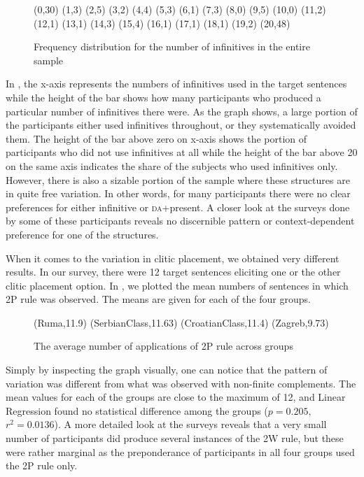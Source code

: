 \documentclass[output=paper,modfonts,newtxmath,hidelinks,]{langscibook}
\begin{document}
\begin{figure}[h]
\footnotesize
\textsf{
%
{
(0,30) (1,3) (2,5) (3,2) (4,4) (5,3) (6,1) (7,3) (8,0) (9,5) (10,0) (11,2) (12,1) (13,1) (14,3) (15,4) (16,1) (17,1) (18,1) (19,2) (20,48)
}}
\caption{Frequency distribution for the number of infinitives in the entire sample}\label{7:fig:key:2}
\end{figure}


In , the x-axis represents the numbers of infinitives used in the target sentences while the height of the bar shows how many participants who produced a particular number of infinitives there were. As the graph shows, a large portion of the participants either used infinitives throughout, or they systematically avoided them. The height of the bar above zero on x-axis shows the portion of participants who did not use infinitives at all while the height of the bar above 20 on the same axis indicates the share of the subjects who used infinitives only. However, there is also a sizable portion of the sample where these structures are in quite free variation. In other words, for many participants there were no clear preferences for either infinitive or \textsc{da}+present. A closer look at the surveys done by some of these participants reveals no discernible pattern or context-dependent preference for one of the structures. 

When it comes to the variation in clitic placement, we obtained very different results. In our survey, there were 12 target sentences eliciting one or the other clitic placement option. In , we plotted the mean numbers of sentences in which 2P rule was observed. The means are given for each of the four groups.

  
\begin{figure}[h]
\footnotesize
\textsf{
%
{
(Ruma,11.9)
(SerbianClass,11.63)
(CroatianClass,11.4)
(Zagreb,9.73)
}}
\caption{The average number of applications of 2P rule across groups}\label{7:fig:key:3}
\end{figure}

\largerpage%
Simply by inspecting the graph visually, one can notice that the pattern of variation was different from what was observed with non-finite complements. The mean values for each of the groups are close to the maximum of 12, and Linear Regression found no statistical difference among the groups ($p=0.205,$ $r^2 = 0.0136$). A more detailed look at the surveys reveals that a very small number of participants did produce several instances of the 2W rule, but these were rather marginal as the preponderance of participants in all four groups used the 2P rule only. 
\end{document}
